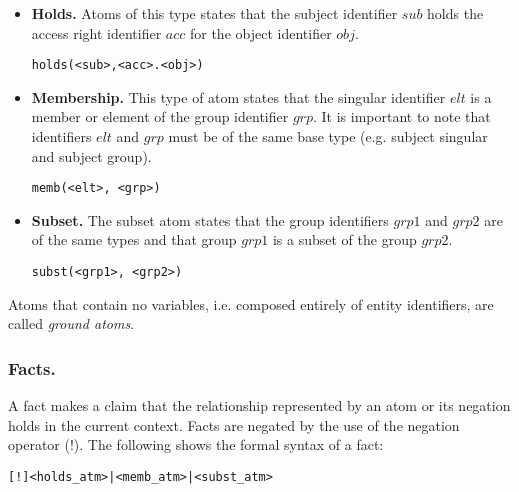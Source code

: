 \documentclass{llncs}
\begin{document}
        \begin{itemize}
          \item
            {\bf Holds.} Atoms of this type states that the subject
            identifier $sub$ holds the access right identifier $acc$ for the
            object identifier $obj$.

            \begin{verbatim}holds(<sub>,<acc>.<obj>)\end{verbatim}

          \vspace{1mm}
          \item
            {\bf Membership.} This type of atom states that the singular
            identifier $elt$ is a member or element of the group identifier
            $grp$. It is important to note that identifiers $elt$ and $grp$
            must be of the same base type (e.g. subject singular and subject
            group).

            \begin{verbatim}memb(<elt>, <grp>)\end{verbatim}

          \vspace{1mm}
          \item
            {\bf Subset.} The subset atom states that the group identifiers
            $grp1$ and $grp2$ are of the same types and that group $grp1$ is
            a subset of the group $grp2$.

            \begin{verbatim}subst(<grp1>, <grp2>)\end{verbatim}
        \end{itemize}

        Atoms that contain no variables, i.e. composed entirely of entity
        identifiers, are called {\em ground atoms}.

      \subsubsection{Facts.}

        A fact makes a claim that the relationship represented by an atom or
        its negation holds in the current context. Facts are negated by the
        use of the negation operator ($!$). The following shows the formal
        syntax of a fact:

        \begin{verbatim}[!]<holds_atm>|<memb_atm>|<subst_atm>\end{verbatim}
\end{document}
